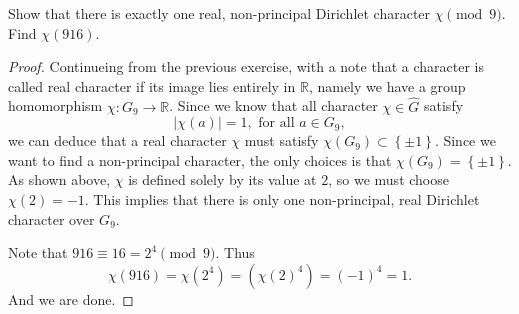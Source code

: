 \documentclass[11pt,letterpaper]{article}
\DeclareMathOperator{\1}{\mathbbm{1}}
\begin{document}
\begin{exercise}
  Show that there is exactly one real, non-principal Dirichlet character $\chi \pmod 9$. Find $\chi(916)$.
\end{exercise}
\begin{proof}
  Continueing from the previous exercise, with a note that a character is called real character if its image lies entirely in
  $\mathbb{R}$, namely  we have a group homomorphism $\chi\colon G_9 \to \mathbb{R}$. Since we know that all character $\chi \in \hat{G}$ satisfy
  \[|\chi(a)| =1, \text{ for all } a \in G_9,\]
  we can deduce that a real character $\chi$ must satisfy $\chi(G_9) \subset \left\lbrace \pm 1 \right\rbrace$. Since
  we want to find a non-principal character, the only choices is that $\chi(G_9) = \left\lbrace \pm 1\right\rbrace$. As shown
  above, $\chi$ is defined solely by its value at $2$, so we must choose $\chi(2) =-1$. This implies that there is only
  one non-principal, real Dirichlet character over $G_9$.

  Note that $916 \equiv 16 = 2^4 \pmod 9$. Thus
  \[ \chi(916) = \chi (2^4) = (\chi(2)^4) = (-1)^4=1.\]
  And we are done.
\end{proof}
\end{document}
